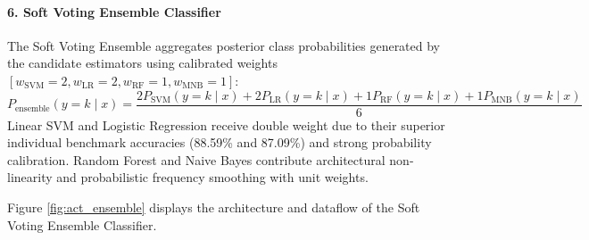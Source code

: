 \paragraph{6. Soft Voting Ensemble Classifier}
The Soft Voting Ensemble aggregates posterior class probabilities generated by the candidate estimators using calibrated weights $[w_{\text{SVM}}=2, w_{\text{LR}}=2, w_{\text{RF}}=1, w_{\text{MNB}}=1]$:
\begin{equation}
P_{\text{ensemble}}(y = k \mid x) = \frac{2 P_{\text{SVM}}(y = k \mid x) + 2 P_{\text{LR}}(y = k \mid x) + 1 P_{\text{RF}}(y = k \mid x) + 1 P_{\text{MNB}}(y = k \mid x)}{6}
\end{equation}
Linear SVM and Logistic Regression receive double weight due to their superior individual benchmark accuracies (88.59\% and 87.09\%) and strong probability calibration. Random Forest and Naive Bayes contribute architectural non-linearity and probabilistic frequency smoothing with unit weights.

Figure \ref{fig:act_ensemble} displays the architecture and dataflow of the Soft Voting Ensemble Classifier.

